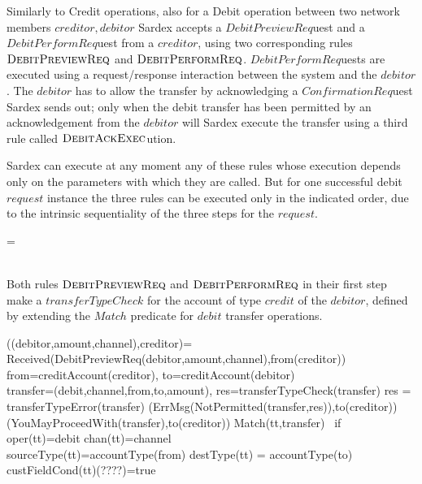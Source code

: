Similarly to Credit operations, also for a Debit operation between two network members $creditor,debitor$ Sardex accepts a $DebitPreviewReq$uest and a  $DebitPerformReq$uest from a $creditor$, using two corresponding rules $\hbox{\sc DebitPreviewReq}$ and $\hbox{\sc DebitPerformReq}$.  $DebitPerformReq$uests are executed using a request/response interaction between the system and the $debitor$. The $debitor$ has to allow the transfer by acknowledging a $ConfirmationReq$uest Sardex sends out; only when the debit transfer has been permitted by an acknowledgement from the $debitor$ will Sardex execute the transfer using a third rule called $\hbox{\sc DebitAckExec}$ution. 

Sardex can execute at any moment any of these rules whose execution depends only on the parameters with which they are called. But for one successful debit $request$ instance the three rules can be executed only in the indicated order, due to the intrinsic sequentiality of the three steps for the $request$.

\begin{asm}
=\+
    \\
    \\
\end{asm}


Both rules $\hbox{\sc DebitPreviewReq}$ and $\hbox{\sc DebitPerformReq}$ in their first step make a $transferTypeCheck$ for the account of type $credit$ of the $debitor$, defined by extending the $Match$ predicate for $debit$ transfer operations. 

\begin{asm}
((debitor,amount,channel),creditor)=\+
  \IF Received(DebitPreviewReq(debitor,amount,channel),from(creditor)) \THEN \+  
    \LET from=creditAccount(creditor), to=creditAccount(debitor)\\
    \LET transfer=(debit,channel,from,to,amount), res=transferTypeCheck(transfer) \+
        \IF res = transferTypeError(transfer) \THEN \+                       (ErrMsg(NotPermitted(transfer,res)),to(creditor))\-
        \ELSE~ (YouMayProceedWith(transfer),to(creditor))\dec\-
\WHERE \+
  Match(tt,transfer) \mbox{ if } \+
        oper(tt)=debit \AND chan(tt)=channel \AND \\
        sourceType(tt)=accountType(from) \AND destType(tt) =  accountType(to) \AND \\ custFieldCond(tt)(????)=true
\end{asm}

